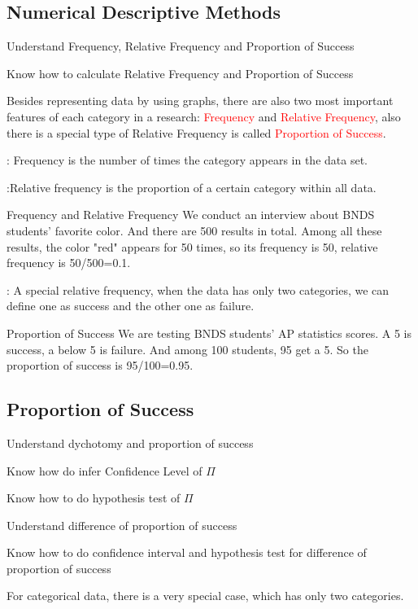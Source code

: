 \subsection{Numerical Descriptive Methods}
\begin{objectives}
    \item Understand Frequency, Relative Frequency and Proportion of Success
    \item Know how to calculate Relative Frequency and Proportion of Success
\end{objectives}
\vbox{}
Besides representing data by using graphs, there are also two most important features of each category in a research: \textcolor{red}{Frequency} and \textcolor{red}{Relative Frequency}, also there is a special type of Relative Frequency is called \textcolor{red}{Proportion of Success}.\\
\begin{description}
    \item {}: Frequency is the number of times the category appears in the data set. 
    \item {}:Relative frequency is the proportion of a certain category within all data.
    \begin{examplebox}{Frequency and Relative Frequency}
    We conduct an interview about BNDS students' favorite color. And there are 500 results in total. Among all these results, the color "red" appears for 50 times, so its frequency is 50, relative frequency is 50/500=0.1.
    \end{examplebox}
    \item {}: A special relative frequency, when the data has only two categories, we can define one as success and the other one as failure.\\
    \begin{examplebox}{Proportion of Success}
        We are testing BNDS students' AP statistics scores. A 5 is success, a below 5 is failure. And among 100 students, 95 get a 5. So the proportion of success is 95/100=0.95.
    \end{examplebox}
\end{description}

\subsection{Proportion of Success}
\begin{objectives}
    \item Understand dychotomy and proportion of success
    \item Know how do infer Confidence Level of \(\Pi\)
    \item Know how to do hypothesis test of \(\Pi\)
    \item Understand difference of proportion of success
    \item Know how to do confidence interval and hypothesis test for difference of proportion of success
\end{objectives}
\vbox{}
For categorical data, there is a very special case, which has only two categories.\\

